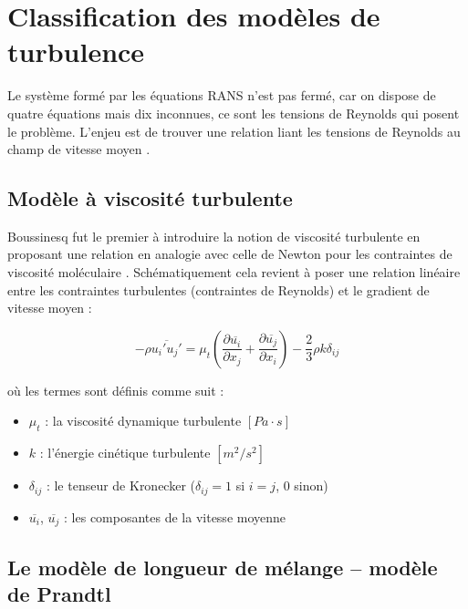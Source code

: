 \section{Classification des modèles de turbulence}
\label{sec:classification_modeles}

Le système formé par les équations RANS n'est pas fermé, car on dispose de quatre équations mais dix inconnues, ce sont les tensions de Reynolds qui posent le problème. L'enjeu est de trouver une relation liant les tensions de Reynolds au champ de vitesse moyen \cite{launder1972lectures}.

\subsection{Modèle à viscosité turbulente}
\label{subsec:viscosite_turbulente}

Boussinesq fut le premier à introduire la notion de viscosité turbulente en proposant une relation en analogie avec celle de Newton pour les contraintes de viscosité moléculaire \cite{boussinesq1877essai}. Schématiquement cela revient à poser une relation linéaire entre les contraintes turbulentes (contraintes de Reynolds) et le gradient de vitesse moyen : \cite{schmitt2007boussinesq}

\begin{equation}
-\rho \overline{u_i' u_j'} = \mu_t \left( \frac{\partial \overline{u_i}}{\partial x_j} + \frac{\partial \overline{u_j}}{\partial x_i} \right) - \frac{2}{3} \rho k \delta_{ij}
\label{eq:boussinesq}
\end{equation}

où les termes sont définis comme suit :
\begin{itemize}
    \item[--] \(\mu_t\) : la viscosité dynamique turbulente \([Pa \cdot s]\)
    \item[--] \(k\) : l'énergie cinétique turbulente \([m^2/s^2]\)
    \item[--] \(\delta_{ij}\) : le tenseur de Kronecker (\(\delta_{ij} = 1\) si \(i=j\), 0 sinon)
    \item[--] \(\overline{u_i}\), \(\overline{u_j}\) : les composantes de la vitesse moyenne
\end{itemize}

\subsection{Le modèle de longueur de mélange -- modèle de Prandtl}
\label{subsec:longueur_melange}

